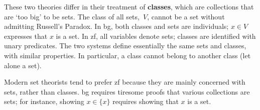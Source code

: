 These two theories differ in their treatment of {\bf classes}, which are
collections that are `too big' to be sets.  The class of all sets,~$V$,
cannot be a set without admitting Russell's Paradox.  In {\sc bg}, both
classes and sets are individuals; $x\in V$ expresses that $x$ is a set.  In
{\sc zf}, all variables denote sets; classes are identified with unary
predicates.  The two systems define essentially the same sets and classes,
with similar properties.  In particular, a class cannot belong to another
class (let alone a set).

Modern set theorists tend to prefer {\sc zf} because they are mainly concerned
with sets, rather than classes.  {\sc bg} requires tiresome proofs that various
collections are sets; for instance, showing $x\in\{x\}$ requires showing that
$x$ is a set.



